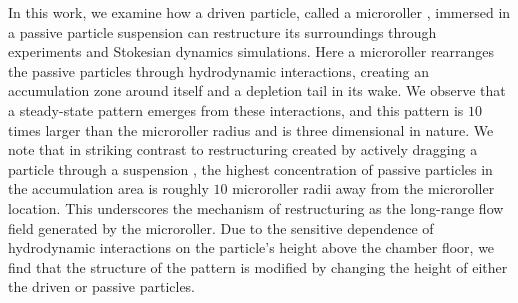 \documentclass[12pt]{article}
\begin{document}
In this work, we examine how a driven particle, called a microroller \cite{delmotte_hydrodynamic_2017}, immersed in a passive particle suspension can restructure its surroundings through experiments and Stokesian dynamics simulations. 
%
Here a microroller rearranges the passive particles through hydrodynamic interactions, creating an accumulation zone around itself and a depletion tail in its wake. We observe that a steady-state pattern emerges from these interactions, and this pattern is $10$ times larger than the microroller radius and is three dimensional in nature. We note that in striking contrast to restructuring created by actively dragging a particle through a suspension \cite{zia_active_2018}, the highest concentration of passive particles in the accumulation area is roughly $10$ microroller radii away from the microroller location. 
This underscores the mechanism of restructuring as the long-range flow field generated by the microroller. Due to the sensitive dependence of hydrodynamic interactions on the particle's height above the chamber floor, we find that the structure of the pattern is modified by changing the height of either the driven or passive particles.
\end{document}
